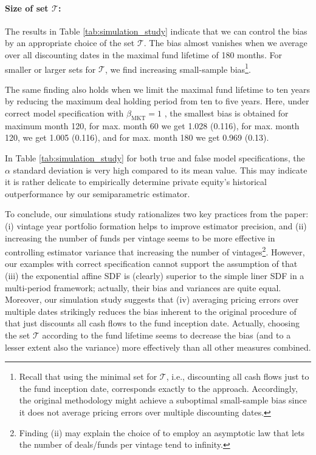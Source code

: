 \documentclass[12pt]{article}
\begin{document}
\paragraph{Size of set $\mathcal{T}$:}

The results in Table \ref{tab:simulation_study} indicate that we can control the bias by an appropriate choice of the set $\mathcal{T}$.
The bias almost vanishes when we average over all discounting dates in the maximal fund lifetime of 180 months. 
For smaller or larger sets for $\mathcal{T}$, we find increasing small-sample bias\footnote{Recall that using the minimal set for $\mathcal{T}$, i.e., discounting all cash flows just to the fund inception date, corresponds exactly to the \cite{DLP12} approach. Accordingly, the original \cite{DLP12} methodology might achieve a suboptimal small-sample bias since it does not average pricing errors over multiple discounting dates.}.

The same finding also holds when we limit the maximal fund lifetime to ten years by reducing the maximum deal holding period from ten to five years. 
Here, under correct model specification with $\beta_{\mathrm{MKT}}=1$ , the smallest bias is obtained for maximum month 120, for max. month 60 we get 1.028 (0.116), for max. month 120, we get 1.005 (0.116), and for max. month 180 we get 0.969 (0.13).

In Table \ref{tab:simulation_study} for both true and false model specifications, the $\alpha$ standard deviation is very high compared to its mean value.
This may indicate it is rather delicate to empirically determine private equity's historical outperformance by our semiparametric estimator. \newline

To conclude, our simulations study rationalizes two key practices from the \cite{DLP12} paper: (i) vintage year portfolio formation helps to improve estimator precision, and (ii) increasing the number of funds per vintage seems to be more effective in controlling estimator variance that increasing the number of vintages\footnote{Finding (ii) may explain the choice of \cite{DLP12} to employ an asymptotic law that lets the number of deals/funds per vintage tend to infinity.}.
However, our examples with correct specification cannot support the assumption of \cite{KN16} that (iii) the exponential affine SDF is (clearly) superior to the simple liner SDF in a multi-period framework; actually, their bias and variances are quite equal.
Moreover, our simulation study suggests that (iv) averaging pricing errors over multiple dates strikingly reduces the bias inherent to the original procedure of \cite{DLP12} that just discounts all cash flows to the fund inception date.
Actually, choosing the set $\mathcal{T}$ according to the fund lifetime seems to decrease the bias (and to a lesser extent also the variance) more effectively than all other measures combined.
\end{document}
